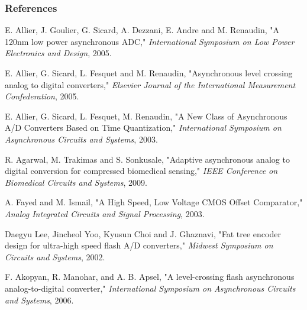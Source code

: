 \documentclass{beamer}
\begin{document}
\begin{frame}
	\frametitle{References}
	\begin{thebibliography}{12}
	\tiny { 	 E. Allier, J. Goulier, G. Sicard, A. Dezzani, E. Andre and M. Renaudin, "A 120nm low power asynchronous ADC,"
 				\emph {International Symposium on Low Power Electronics and Design}, 2005.

				 E. Allier, G. Sicard, L. Fesquet and M. Renaudin, "Asynchronous level crossing analog to digital converters," 
				\emph {Elsevier Journal of the International Measurement Confederation}, 2005.

				 E. Allier, G. Sicard, L. Fesquet, M. Renaudin,  "A New Class of Asynchronous A/D Converters Based on Time Quantization," 
				\emph {International Symposium on Asynchronous Circuits and Systems}, 2003.

				 R. Agarwal, M. Trakimas and S. Sonkusale, "Adaptive asynchronous analog to digital conversion for compressed biomedical sensing,"
				\emph {IEEE Conference on Biomedical Circuits and Systems}, 2009.

				 A. Fayed and M. Ismail, "A High Speed, Low Voltage CMOS Offset Comparator," 
				\emph {Analog Integrated Circuits and Signal Processing}, 2003.

				 Daegyu Lee, Jincheol Yoo, Kyusun Choi and J. Ghaznavi, "Fat tree encoder design for ultra-high speed flash A/D converters,"
				\emph { Midwest Symposium on Circuits and Systems}, 2002.

				 F. Akopyan, R. Manohar, and A. B. Apsel, "A level-crossing flash asynchronous analog-to-digital converter," 
				\emph {International Symposium on Asynchronous Circuits and Systems}, 2006. }
	\end{thebibliography}
\end{frame}
\end{document}
